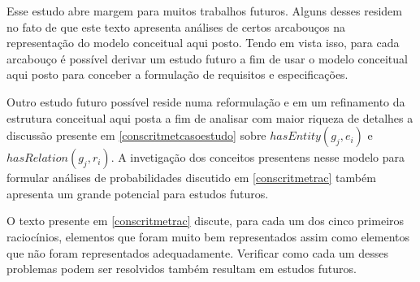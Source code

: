 Esse estudo abre margem para muitos trabalhos futuros. Alguns desses residem no fato de que este texto apresenta análises de certos arcabouços na representação do modelo conceitual aqui posto. Tendo em vista isso, para cada arcabouço é possível derivar um estudo futuro a fim de usar o modelo conceitual aqui posto para conceber a formulação de requisitos e especificações. 

Outro estudo futuro possível reside numa reformulação e em um refinamento da estrutura conceitual aqui posta a fim de analisar com maior riqueza de detalhes a discussão presente em \ref{conscritmetcasoestudo} sobre $hasEntity(g_j,e_i)$ e $hasRelation(g_j,r_i)$. A invetigação dos conceitos presentens nesse modelo para formular análises de probabilidades discutido em \ref{conscritmetrac} também apresenta um grande potencial para estudos futuros.

O texto presente em \ref{conscritmetrac} discute, para cada um dos cinco primeiros raciocínios, elementos que foram muito bem representados assim como elementos que não foram representados adequadamente. Verificar como cada um desses problemas podem ser resolvidos também resultam em estudos futuros. 